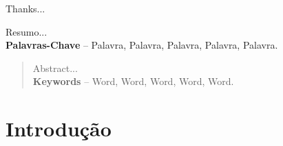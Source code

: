 \documentclass[]{politex}
\begin{document}
\capa
\falsafolhaderosto
\folhaderosto




\begin{agradecimentos}

Thanks...

\end{agradecimentos}


\begin{resumo}
Resumo...
%
\\[3\baselineskip]
%
\textbf{Palavras-Chave} -- Palavra, Palavra, Palavra, Palavra, Palavra.
\end{resumo}

\begin{abstract}
Abstract...
%
\\[3\baselineskip]
%
\textbf{Keywords} -- Word, Word, Word, Word, Word.
\end{abstract}

\listadefiguras
\listadetabelas

\sumario


\part{Introdução}

\end{document}
